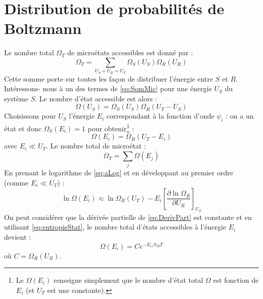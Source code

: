 \documentclass	[11pt, a4paper, openany]{book}
\begin{document}
		\section{Distribution de probabilités de Boltzmann}
		Le nombre total $\Omega_T$ de microétats accessibles est donné par :
		\begin{equation}
			\Omega_T = \sum_{U_S+U_R=U_T} \Omega_S(U_S)\Omega_R(U_R)
			\label{eq:SomMic}
		\end{equation}
		Cette somme porte sur toutes les façon de distribuer l'énergie entre $S$ et $R$. Intéressons-
		nous à  un des termes de \autoref{eq:SomMic} pour une énergie $U_S$ du système $S$. Le nombre
		d'état accessible est alors :
		\begin{equation}
			\Omega(U_S) = \Omega_S(U_S)\Omega_R(U_T-U_S)
		\end{equation}
		Choisissons pour $U_S$ l'énergie $E_i$ correspondant à la fonction d'onde $\psi_i$ : on a un
		état et donc $\Omega_S(E_i) = 1$ pour obtenir\footnote{Le $\Omega(E_i)$ renseigne simplement 
			que le nombre d'état total $\Omega$ est fonction de $E_i$ (et $U_T$ est une constante).} :
		\begin{equation}
			\Omega(E_i) = \Omega_R(U_T-E_i)
			\label{eq:aLog}
		\end{equation}
		avec $E_i \ll U_T$. Le nombre total de microétat : 
		\begin{equation}
			\Omega_T = \sum_j \Omega(E_j)
		\end{equation}
		En prenant le logarithme de \autoref{eq:aLog} et en développant au premier ordre (comme $E_i
		\ll U_T$) :
		\begin{equation}
			\ln\Omega(E_i) \approx \ln\Omega_R(U_T) - E_i\left[\dfrac{\partial \ln\Omega_R}{\partial U_R}
			\right]_{U_T}
			\label{eq:DerivPart}
		\end{equation}
		On peut considérer que la dérivée partielle de \autoref{eq:DerivPart} est constante et en 
		utilisant \autoref{eq:entropieStat}, le nombre total d'états accessibles à l'énergie $E_i$ 
		devient :
		\begin{equation}
			\Omega(E_i) = Ce^{-E_i/k_BT}
		\end{equation}
		où $C = \Omega_R(U_R)$.\newpage
		
\end{document}
